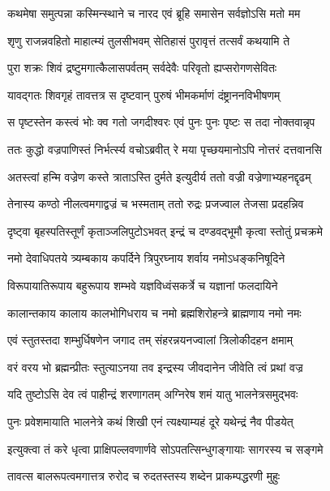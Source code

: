 \twolineshloka
{कथमेषा समुत्पन्ना कस्मिन्स्थाने च नारद}
{एवं ब्रूहि समासेन सर्वज्ञोऽसि मतो मम} %


\twolineshloka
{शृणु राजन्नवहितो माहात्म्यं तुलसीभवम्}
{सेतिहासं पुरावृत्तं तत्सर्वं कथयामि ते} %

\twolineshloka
{पुरा शक्रः शिवं द्रष्टुमगात्कैलासपर्वतम्}
{सर्वदेवैः परिवृतो ह्यप्सरोगणसेवितः} %

\twolineshloka
{यावद्गतः शिवगृहं तावत्तत्र स दृष्टवान्}
{पुरुषं भीमकर्माणं दंष्ट्राननविभीषणम्} %

\twolineshloka
{स पृष्टस्तेन कस्त्वं भोः क्व गतो जगदीश्वरः}
{एवं पुनः पुनः पृष्टः स तदा नोक्तवान्नृप} %

\twolineshloka
{ततः कुद्धो वज्रपाणिस्तं निर्भर्त्स्य वचोऽब्रवीत्}
{रे मया पृच्छयमानोऽपि नोत्तरं दत्तवानसि} %

\twolineshloka
{अतस्त्वां हन्मि वज्रेण कस्ते त्राताऽस्ति दुर्मते}
{इत्युदीर्य ततो वज्री वज्रेणाभ्यहनद्दृढम्} %

\twolineshloka
{तेनास्य कण्ठो नीलत्वमगाद्वज्रं च भस्मताम्}
{ततो रुद्रः प्रजज्वाल तेजसा प्रदहन्निव} %

\twolineshloka
{दृष्ट्वा बृहस्पतिस्तूर्णं कृताञ्जलिपुटोऽभवत्}
{इन्द्रं च दण्डवद्भूमौ कृत्वा स्तोतुं प्रचक्रमे} %


\twolineshloka
{नमो देवाधिपतये त्र्यम्बकाय कपर्दिने}
{त्रिपुरघ्नाय शर्वाय नमोऽधङ्कनिषूदिने} %

\twolineshloka
{विरूपायातिरूपाय बहुरूपाय शम्भवे}
{यज्ञविध्वंसकर्त्रे च यज्ञानां फलदायिने} %

\twolineshloka
{कालान्तकाय कालाय कालभोगिधराय च}
{नमो ब्रह्मशिरोहन्त्रे ब्राह्मणाय नमो नमः} %


\twolineshloka
{एवं स्तुतस्तदा शम्भुर्धिषणेन जगाद तम्}
{संहरन्नयनज्वालां त्रिलोकीदहन क्षमाम्} %

\twolineshloka
{वरं वरय भो ब्रह्मन्प्रीतः स्तुत्याऽनया तव}
{इन्द्रस्य जीवदानेन जीवेति त्वं प्रथां वज्र} %


\twolineshloka
{यदि तुष्टोऽसि देव त्वं पाहीन्द्रं शरणागतम्}
{अग्निरेष शमं यातु भालनेत्रसमुद्भवः} %


\twolineshloka
{पुनः प्रवेशमायाति भालनेत्रे कथं शिखी}
{एनं त्यक्ष्याम्यहं दूरे यथेन्द्रं नैव पीडयेत्} %


\twolineshloka
{इत्युक्त्वा तं करे धृत्वा प्राक्षिपल्लवणार्णवे}
{सोऽपतत्सिन्धुगङ्गायाः सागरस्य च सङ्गमे} %

\twolineshloka
{तावत्स बालरूपत्वमगात्तत्र रुरोद च}
{रुदतस्तस्य शब्देन प्राकम्पद्धरणी मुहुः} %

